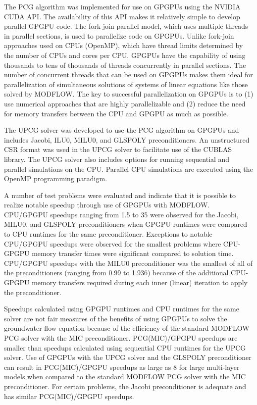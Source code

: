 \documentclass[12pt]{article}
\begin{document}
The PCG algorithm was implemented for use on GPGPUs using the NVIDIA \color{blue}CUDA API\color{black}. The availability of this API makes it relatively simple to develop parallel GPGPU code. The fork-join parallel model, which uses multiple threads in parallel sections, is used to parallelize code on GPGPUs. Unlike fork-join approaches used on CPUs (OpenMP), which have thread limits determined by the number of CPUs and cores per CPU, GPGPUs have the capability of using thousands to tens of thousands of threads concurrently in parallel sections. The number of concurrent threads that can be used on GPGPUs makes them ideal for parallelization of simultaneous solutions of systems of linear equations like those solved by MODFLOW. The key to successful parallelization on GPGPUs is to (1) use numerical approaches that are highly parallelizable and (2) reduce the need for memory transfers between the CPU and GPGPU as much as possible.

The UPCG solver was developed to \color{blue}use \color{black} the PCG algorithm on GPGPUs and includes Jacobi, ILU0, MILU0, and GLSPOLY preconditioners. An unstructured CSR format was used in the UPCG solver to facilitate use of the CUBLAS library. The UPCG solver also includes options for running sequential and parallel simulations on the CPU. Parallel CPU simulations are executed using the OpenMP programming paradigm.

A number of test problems were evaluated and indicate that it is possible to realize notable speedup through use of GPGPUs with MODFLOW.  CPU/GPGPU speedups ranging from 1.5 to 35 were observed for the Jacobi, MILU0, and GLSPOLY preconditioners when GPGPU runtimes were compared to CPU runtimes for the same preconditioner. Exceptions to notable CPU/GPGPU speedups were observed for the smallest problems where CPU-GPGPU memory transfer times were significant compared to solution time. CPU/GPGPU speedups with the MILU0 preconditioner was the smallest of all of the preconditioners (ranging from 0.99 to 1.936) because of the additional CPU-GPGPU memory transfers required during each inner (linear) iteration to apply the preconditioner.

Speedups calculated using GPGPU runtimes and CPU runtimes for the same solver are not fair measures of the benefits of using GPGPUs to solve the groundwater flow equation because of the efficiency of the standard MODFLOW PCG solver with the MIC preconditioner. PCG(MIC)/GPGPU speedups are smaller than speedups calculated using sequential CPU runtimes for the UPCG solver. Use of GPGPUs with the UPCG solver and the GLSPOLY preconditioner can result in PCG(MIC)/GPGPU speedups as large as 8 for large multi-layer models when compared to the standard MODFLOW PCG solver with the MIC preconditioner. For certain problems, the Jacobi preconditioner is adequate and has similar PCG(MIC)/GPGPU speedups.
\end{document}
